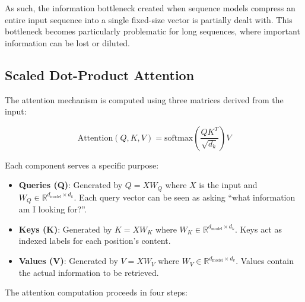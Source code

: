 As such, the information bottleneck created when sequence models compress an entire input sequence into a single fixed-size vector is partially dealt with. This bottleneck becomes particularly problematic for long sequences, where important information can be lost or diluted.


\subsection{Scaled Dot-Product Attention} \label{attention}

The attention mechanism is computed using three matrices derived from the input:

\begin{equation}
\text{Attention}(Q, K, V) = \text{softmax}\left(\frac{QK^T}{\sqrt{d_k}}\right)V
\end{equation}

Each component serves a specific purpose:

\begin{itemize}
   \item \textbf{Queries (Q)}: Generated by $Q = XW_Q$ where $X$ is the input and $W_Q \in \mathbb{R}^{d_{\text{model}} \times d_k}$. Each query vector can be seen as asking ``what information am I looking for?''.
   \item \textbf{Keys (K)}: Generated by $K = XW_K$ where $W_K \in \mathbb{R}^{d_{\text{model}} \times d_k}$. Keys act as indexed labels for each position's content.
   \item \textbf{Values (V)}: Generated by $V = XW_V$ where $W_V \in \mathbb{R}^{d_{\text{model}} \times d_v}$. Values contain the actual information to be retrieved.
\end{itemize}

The attention computation proceeds in four steps:


